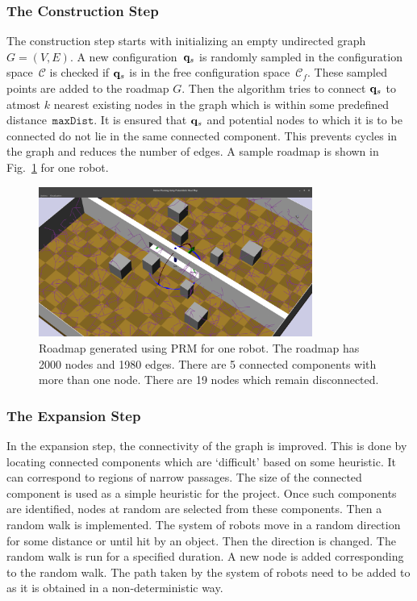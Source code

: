 \documentclass[12pt,a4paper, onecolumn]{IEEEtran}
\newcommand{\fgref}[1]{Fig.~\ref{#1}}
\begin{document}
\subsubsection{The Construction Step}
The construction step starts with initializing an empty undirected graph $G=(V,E)$. A new
configuration~$\mathbf{q}_s$ is randomly sampled in the configuration space~$\mathcal C$ is
checked if $\mathbf{q}_s$ is in the free configuration space~$\mathcal C_f$. These sampled
points are added to the roadmap $G$. Then the algorithm tries to connect $\mathbf{q}_s$ to
atmost $k$ nearest existing nodes in the graph which is within some predefined
distance~${\texttt {maxDist}}$. It is ensured that $\mathbf{q}_s$ and potential nodes to which
it is to be connected do not lie in the same connected component. This prevents cycles in
the graph and reduces the number of edges. A sample roadmap is shown in
\fgref{fig:roadmap} for one robot.
\begin{figure}[htbp]
  \centering
  \includegraphics[width=0.8\textwidth]{prm_roadmap.png}
  \caption{Roadmap generated using PRM for one robot. The roadmap has 2000 nodes and 1980
  edges. There are 5 connected components with more than one node. There are 19 nodes
which remain disconnected.}
  \label{fig:roadmap}
\end{figure}
\subsubsection{The Expansion Step}
In the expansion step, the connectivity of the graph is improved. This is done by locating
connected components which are `difficult' based on some heuristic. It can correspond to
regions of narrow passages. The size of the connected component is used as a simple
heuristic for the project. Once such components are identified, nodes at random are
selected from these components. Then a random walk is implemented. The system of robots
move in a random direction for some distance or until hit by an object. Then the direction
is changed. The random walk is run for a specified duration. A new node is added
corresponding to the random walk. The path taken by the system of robots need to be added
to as it is obtained in a non-deterministic way.
\end{document}
